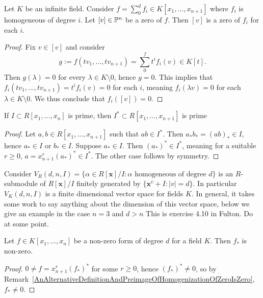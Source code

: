 \begin{lemma}\label{FormsInFormDecompVanish}
    Let $K$ be an infinite field. Consider $f=\sum_0^d f_i\in K[x_1,\dots,x_{n+1}]$ where $f_i$ is homogeneous of degree $i$. Let $[v]\in \mathbb{P}^n$ be a zero of $f$. Then $[v]$ is a zero of $f_i$ for each $i$. 
\end{lemma}
\begin{proof}
    Fix $v\in [v]$ and consider 
    $$g:= f(tv_1,\dots, tv_{n+1})=\sum_0^f t^if_i(v)\in K[t].$$
    Then $g(\lambda)=0$ for every $\lambda \in K\setminus 0$, hence $g=0$. This implies that $f_i(tv_1,\dots,tv_{n+1})=t^{i}f_i(v)=0$ for each $i$, meaning $f_i(\lambda v)=0$ for each $\lambda \in K\setminus 0$. We thus conclude that $f_i([v])=0$. 
\end{proof}

\begin{lemma}\label{HomogenizationOfPrimeIdealIsPrime}
    If $I\subset R[x_1,\dots,x_n]$ is prime, then $I^\ast\subset R[x_1,\dots,x_{n+1}]$ is prime
\end{lemma}
\begin{proof}
    Let $a,b\in R[x_1,\dots,x_{n+1}]$ such that $ab\in I^\ast$. Then $a_\ast b_\ast = (ab)_\ast \in I$, hence $a_\ast \in I$ or $b_\ast\in I$. Suppose $a_\ast \in I$. Then $(a_\ast)^\ast\in I^\ast$, meaning for a suitable $r\geq 0$, $a=x_{n+1}^r(a_\ast)^\ast \in I^\ast$. The other case follows by symmetry.
\end{proof}
\begin{remark}\label{VectorSpaceOfForms}
    Consider $V_R(d,n,I)=\{ \alpha \in R[\mathbf{x}]/I : \alpha \text{ homogeneous of degree } d\}$ is an $R$-submodule of $R[\mathbf{x}]/I$ finitely generated by $\{\mathbf{x}^v + I:\vert v\vert =d\}.$ In particular $V_K(d,n,I)$ is a finite dimensional vector space for fields $K$. In general, it takes some work to say anything about the dimension of this vector space, below we give an example in the case $n=3$ and $d>n$ {\Large This is exercise 4.10 in Fulton. Do at some point}. 
\end{remark}
\begin{example}
    
\end{example}
\begin{lemma}\label{TechnicalLemmaForNoetherLemma}
    Let $f\in K[x_1,\dots,x_n]$ be a non-zero form of degree $d$ for a field $K$. Then $f_\ast$ is non-zero.
\end{lemma}
\begin{proof}
    $0\neq f = x_{n+1}^r(f_\ast)^\ast$ for some $r\geq 0$, hence $(f_\ast)^\ast \neq 0$, so by Remark~\ref{AnAlternativeDefinitionAndPreimageOfHomogenizationOfZeroIsZero}, $f_\ast \neq 0$.     
\end{proof}
